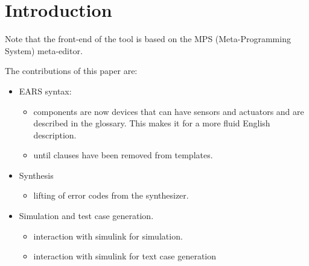 \section{Introduction}


Note that the front-end of
the tool is based on the MPS (Meta-Programming System) meta-editor.

The contributions of this paper are:
\begin{itemize}
  \item EARS syntax:
\begin{itemize}
  \item components are now devices that can have sensors and actuators and are
  described in the glossary. This makes it for a more fluid English description. 
  \item until clauses have been removed from templates. 
\end{itemize}
\item{Synthesis}
\begin{itemize}
  \item lifting of error codes from the synthesizer. 
\end{itemize}
\item Simulation and test case generation.
\begin{itemize}
  \item interaction with simulink for simulation.
  \item interaction with simulink for text case generation
\end{itemize}


\end{itemize}